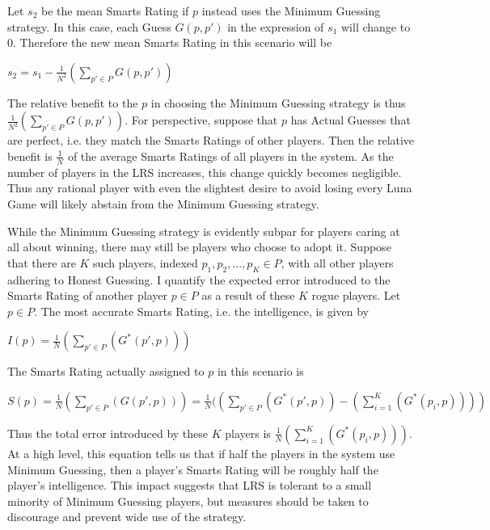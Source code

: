 \noindent Let $s_2$ be the mean Smarts Rating if $p$ instead uses the Minimum Guessing strategy. In this case, each Guess $G(p, p')$ in the expression of $s_1$ will change to $0$. Therefore the new mean Smarts Rating in this scenario will be 
\begin{center}
\begin{math}
s_2 = s_1 - \frac{1}{N^2}(\sum_{p' \in P} G(p, p'))
\end{math}
\end{center}
The relative benefit to the $p$ in choosing the Minimum Guessing strategy is thus \\
$\frac{1}{N^2}(\sum_{p' \in P} G(p, p'))$. For perspective, suppose that $p$ has Actual Guesses that are perfect, i.e. they match the Smarts Ratings of other players. Then the relative benefit is $\frac{1}{N}$ of the average Smarts Ratings of all players in the system.  As the number of players in the LRS increases, this change quickly becomes negligible. Thus any rational player with even the slightest desire to avoid losing every Luna Game will likely abstain from the Minimum Guessing strategy.

While the Minimum Guessing strategy is evidently subpar for players caring at all about winning, there may still be players who choose to adopt it. Suppose that there are $K$ such players, indexed $p_1, p_2, ..., p_K \in P$, with all other players adhering to Honest Guessing. I quantify the expected error introduced to the Smarts Rating of another player $p \in P$ as a result of these $K$ rogue players. Let $p \in P$. The most accurate Smarts Rating, i.e. the intelligence, is given by
\begin{center}
\begin{math}
I(p) = \frac{1}{N}(\sum_{p' \in P}(G^*(p', p)))
\end{math}
\end{center}
The Smarts Rating actually assigned to $p$ in this scenario is
\begin{center}
\begin{math}
S(p) = \frac{1}{N}(\sum_{p' \in P}(G(p', p))) = \frac{1}{N}((\sum_{p' \in P}(G^*(p', p)) - (\sum_{i=1}^K(G^*(p_i, p))))
\end{math}
\end{center}
Thus the total error introduced by these $K$ players is $\frac{1}{N}(\sum_{i=1}^K(G^*(p_i, p)))$. At a high level, this equation tells us that if half the players in the system use Minimum Guessing, then a player's Smarts Rating will be roughly half the player's intelligence. This impact suggests that LRS is tolerant to a small minority of Minimum Guessing players, but measures should be taken to discourage and prevent wide use of the strategy.

